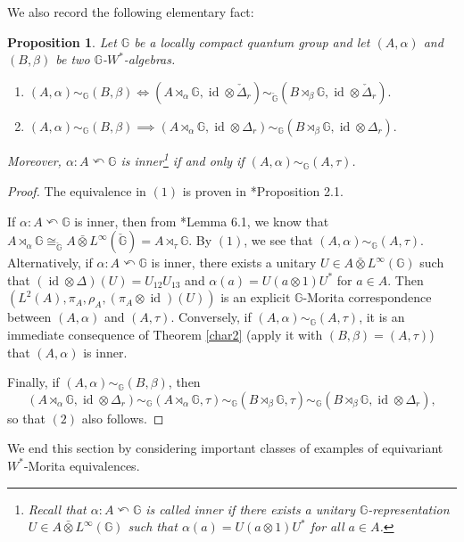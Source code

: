 \documentclass[reqno]{amsart}
\numberwithin{equation}{section}
\newtheorem{Prop}[Theorem]{Proposition}
\DeclareMathOperator{\id}{\mathrm{id}}
\newcommand{\G}{\mathbb{G}}
\newcommand{\ovot}{\bar{\otimes}}
\begin{document}
We also record the following elementary fact:
\begin{Prop}\label{crossed product}
Let $\G$ be a locally compact quantum group and let $(A, \alpha)$ and $(B, \beta)$ be two $\G$-$W^*$-algebras.
    \begin{enumerate}\setlength\itemsep{-0.5em}
        \item $(A, \alpha)\sim_\G (B, \beta) \iff (A\rtimes_\alpha \G, \id \otimes \check{\Delta}_r)\sim_{\check{\G}}(B\rtimes_\beta \G, \id \otimes \check{\Delta}_r).$
        \item $(A, \alpha)\sim_\G (B, \beta) \implies (A\rtimes_\alpha \G, \id \otimes \Delta_r)\sim_{\G}(B\rtimes_\beta \G, \id \otimes \Delta_r).$
    \end{enumerate}
    Moreover, $\alpha: A \curvearrowleft \G$ is inner\footnote{Recall that $\alpha: A\curvearrowleft \G$ is called inner if there exists a unitary $\G$-representation $U\in A \ovot L^\infty(\G)$ such that $\alpha(a)= U(a\otimes 1)U^*$ for all $a\in A$.} if and only if $(A, \alpha)\sim_\G (A, \tau)$.
\end{Prop}
\begin{proof} The equivalence in $(1)$ is proven in \cite{DR24b}*{Proposition 2.1}.

If $\alpha: A \curvearrowleft \G$ is inner, then from \cite{DR24a}*{Lemma 6.1}, we know that $A \rtimes_\alpha \G \cong_{\check{\G}} A \ovot L^\infty(\check{\G}) = A \rtimes_\tau \G$. By $(1)$, we see that $(A, \alpha)\sim_{\G} (A, \tau)$. Alternatively, if $\alpha: A \curvearrowleft \G$ is inner, there exists a unitary $U\in A \ovot L^\infty(\G)$ such that $(\id \otimes \Delta)(U) = U_{12}U_{13}$ and $\alpha(a)= U(a\otimes 1)U^*$ for $a\in A$. Then $(L^2(A), \pi_A, \rho_A, (\pi_A\otimes \id)(U))$ is an explicit $\G$-Morita correspondence between $(A, \alpha)$ and $(A, \tau)$. Conversely, if $(A, \alpha)\sim_\G (A, \tau)$, it is an immediate consequence of Theorem \ref{char2} (apply it with $(B, \beta)= (A, \tau)$) that $(A, \alpha)$ is inner. 

Finally, if $(A, \alpha)\sim_\G (B, \beta)$, then 
$$(A\rtimes_\alpha \G, \id \otimes \Delta_r) \sim_\G (A\rtimes_\alpha \G, \tau) \sim_\G (B\rtimes_\beta \G, \tau) \sim_\G (B\rtimes_\beta \G, \id \otimes \Delta_r),$$
so that $(2)$ also follows.
\end{proof}

We end this section by considering important classes of examples of equivariant $W^*$-Morita equivalences.
\end{document}
